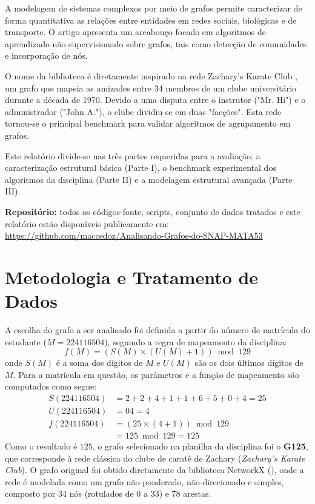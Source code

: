 \documentclass[sigconf,nonacm]{webmedia}
\begin{document}
A modelagem de sistemas complexos por meio de grafos permite caracterizar de forma quantitativa as relações entre entidades em redes sociais, biológicas e de transporte. O artigo \cite{Rozemberczki2020} apresenta um arcabouço focado em algoritmos de aprendizado não supervisionado sobre grafos, tais como detecção de comunidades e incorporação de nós. 

O nome da biblioteca é diretamente inspirado na rede  {Zachary's Karate Club} \cite{Zachary1977}, um grafo que mapeia as amizades entre 34 membros de um clube universitário durante a década de 1970. Devido a uma disputa entre o instrutor ("Mr. Hi") e o administrador ("John A."), o clube dividiu-se em duas "facções". Esta rede tornou-se o principal  {benchmark} para validar algoritmos de agrupamento em grafos.

Este relatório divide-se nas três partes requeridas para a avaliação: a caracterização estrutural básica (Parte I), o benchmark experimental dos algoritmos da disciplina (Parte II) e a modelagem estrutural avançada (Parte III).

\medskip
\noindent\textbf{Repositório:} todos os códigos-fonte, scripts, conjunto de dados tratados e este relatório estão disponíveis publicamente em: \url{https://github.com/maccedoz/Analisando-Grafos-do-SNAP-MATA53}

\section{Metodologia e Tratamento de Dados}

A escolha do grafo a ser analisado foi definida a partir do número de matrícula do estudante ($M = 224116504$), seguindo a regra de mapeamento da disciplina:
\begin{equation}
    f(M) = (S(M) \times (U(M) + 1)) \bmod 129
\end{equation}
onde $S(M)$ é a soma dos dígitos de $M$ e $U(M)$ são os dois últimos dígitos de $M$. Para a matrícula em questão, os parâmetros e a função de mapeamento são computados como segue:
\begin{align}
    S(224116504) &= 2+2+4+1+1+6+5+0+4 = 25 \\
    U(224116504) &= 04 = 4 \\
    f(224116504) &= (25 \times (4 + 1)) \bmod 129 \nonumber \\
    &= 125 \bmod 129 = 125
\end{align}
Como o resultado é $125$, o grafo selecionado na planilha da disciplina foi o \textbf{G125}, que corresponde à rede clássica do clube de caratê de Zachary (\textit{Zachary's Karate Club}). O grafo original foi obtido diretamente da biblioteca NetworkX (), onde a rede é modelada como um grafo não-ponderado, não-direcionado e simples, composto por 34 nós (rotulados de 0 a 33) e 78 arestas.
\end{document}
